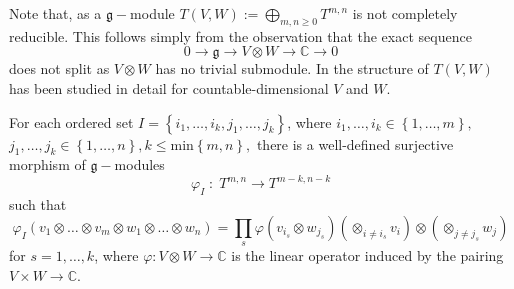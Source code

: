 \documentclass{svmult}
\newcommand {\CC} {\mathbb {C}}
\renewcommand{\gg}{\mathfrak{g}}
\renewcommand {\phi} {\varphi}
\begin{document}
Note that, as a $\gg-$module $T(V,W):=\bigoplus_{m,n\geq 0} T^{m,n}$ is not completely reducible. This follows simply from the observation that the exact sequence
\begin{equation}\label{seqv}
 0 \rightarrow \gg \rightarrow V \otimes W \rightarrow \CC \rightarrow 0\nonumber
\end{equation}
does not split as $V \otimes W$ has no trivial submodule. In \cite{pstyr} the structure of $T(V,W)$ has been studied in detail for 
countable-dimensional $V$ and $W$.

For each ordered set 
$I=\left\lbrace i_1, \dots, i_k, j_1, \dots, j_k\right\rbrace$, where $i_1, \dots, i_k \in \left\lbrace1,\dots,m\right\rbrace,$ $j_1,\dots,j_k \in \left\lbrace1,\dots,n\right\rbrace, k \leq \mathrm{min}\left\lbrace m,n \right\rbrace,$ 
there is a well-defined surjective morphism of $\gg-$modules
\begin{equation}\label{comp_contr}
 \varphi_I\; : \; T^{m,n} \longrightarrow T^{m-k,n-k}\nonumber
\end{equation}
such that 
\begin{equation}
 \phi_I(v_1 \otimes \dots \otimes v_m \otimes w_1 \otimes \dots \otimes w_n) = \prod_s \phi(v_{i_s} \otimes w_{j_s}) (\otimes_{i\neq i_s} v_i)\otimes(\otimes_{j\neq j_s} w_j) \nonumber
\end{equation}
for $s=1,\dots,k$, where $\phi:V\otimes W \rightarrow \CC$ is the linear operator induced by the pairing $V\times W\rightarrow \CC$.

\end{document}
